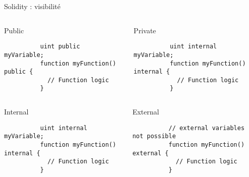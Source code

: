 \begin{frame}[fragile]{Solidity : visibilité}
  \begin{columns}
    \begin{column}{0.47\textwidth}
      \begin{block}{Public}
        \begin{verbatim}
          uint public myVariable;
          function myFunction() public {
            // Function logic
          }
        \end{verbatim}
      \end{block}
    \end{column}
    \vspace{0.03\textwidth}
    \begin{column}{0.47\textwidth}
      \begin{block}{Private}
        \begin{verbatim}
          uint internal myVariable;
          function myFunction() internal {
            // Function logic
          }
        \end{verbatim}
      \end{block}
    \end{column}
  \end{columns}

  \begin{columns}
    \begin{column}{0.47\textwidth}
      \begin{block}{Internal}
        \begin{verbatim}
          uint internal myVariable;
          function myFunction() internal {
            // Function logic
          }
        \end{verbatim}
      \end{block}
    \end{column}
    \vspace{0.03\textwidth}
    \begin{column}{0.47\textwidth}
      \begin{block}{External}
        \begin{verbatim}
          // external variables not possible 
          function myFunction() external {
            // Function logic
          }
        \end{verbatim}
      \end{block}
    \end{column}
  \end{columns}
\end{frame}



